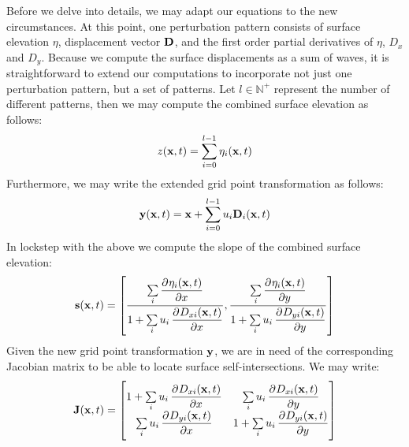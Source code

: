 Before we delve into details, we may adapt our equations to the new
circumstances. At this point, one perturbation pattern consists of surface
elevation $\eta$, displacement vector $\mathbf{D}$, and the first order partial
derivatives of $\eta$, $D_x$ and $D_y$. Because we compute the surface
displacements as a sum of waves, it is straightforward to extend our
computations to incorporate not just one perturbation pattern, but a set of
patterns. Let $l \in \mathbb{N}^+$ represent the number of different patterns,
then we may compute the combined surface elevation as follows:
\begin{equation}
 z(\mathbf{x},t) = \sum\limits_{i=0}^{l-1}\eta_i(\mathbf{x},t)
\end{equation}
Furthermore, we may write the extended grid point transformation as follows:
\begin{equation}
\mathbf{y}(\mathbf{x},t) = \mathbf{x}+\sum\limits_{i=0}^{l-1}u_i\mathbf{D}_i(\mathbf{x},t) 
\end{equation}
In lockstep with the above we compute the slope of the combined surface elevation:
\begin{equation}
\mvec{s}(\mvec{x},t) = \left[\frac{\sum\limits_i \dpd{\eta_i(\mvec{x},t)}{x}}{1 
+ \sum\limits_i u_i \dpd{D_{xi}(\mvec{x},t)}{x}}, \frac{\sum\limits_i 
\dpd{\eta_i(\mvec{x},t)}{y}}{1 + \sum\limits_i 
u_i\dpd{D_{yi}(\mvec{x},t)}{y}}\right]
\end{equation}
Given the new grid point transformation $\mathbf{y}$, we are in need of the corresponding
Jacobian matrix to be able to locate surface self-intersections. We may write:
\begin{equation}
 \mvec{J}(\mvec{x},t) =
 \begin{bmatrix}
   1 + \sum\limits_i u_i\dpd{D_{xi}(\mvec{x},t)}{x} & \sum\limits_i u_i\dpd{D_{xi}(\mvec{x},t)}{y} \\
   \sum\limits_i u_i\dpd{D_{yi}(\mvec{x},t)}{x} & 1 + \sum\limits_i u_i\dpd{D_{yi}(\mvec{x},t)}{y}
 \end{bmatrix}
\end{equation}
%
